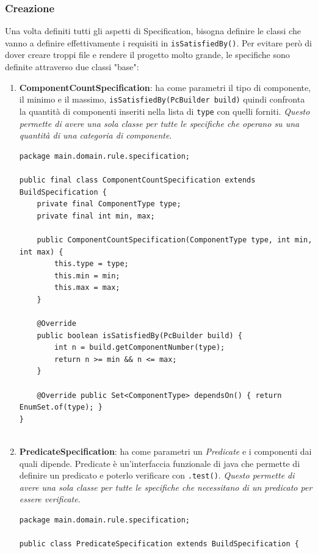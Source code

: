 \documentclass[12pt,a4paper]{article}
\begin{document}
\subsubsection{Creazione}
Una volta definiti tutti gli aspetti di Specification, bisogna definire le classi che vanno a definire effettivamente i requisiti in \texttt{isSatisfiedBy()}. Per evitare però di dover creare troppi file e rendere il progetto molto grande, le specifiche sono definite attraverso due classi "base":
\begin{enumerate}
    \item \textbf{ComponentCountSpecification}: ha come parametri il tipo di componente, il minimo e il massimo, \texttt{isSatisfiedBy(PcBuilder build)} quindi confronta la quantità di componenti inseriti nella lista di \texttt{type} con quelli forniti. \textit{Questo permette di avere una sola classe per tutte le specifiche che operano su una quantità di una categoria di componente}.
    \begin{lstlisting}[style=intellijlight, caption={A simple Java class}, label={lst:hello}]
package main.domain.rule.specification;

public final class ComponentCountSpecification extends BuildSpecification {
    private final ComponentType type;
    private final int min, max;

    public ComponentCountSpecification(ComponentType type, int min, int max) {
        this.type = type;
        this.min = min;
        this.max = max;
    }

    @Override
    public boolean isSatisfiedBy(PcBuilder build) {
        int n = build.getComponentNumber(type);
        return n >= min && n <= max;
    }

    @Override public Set<ComponentType> dependsOn() { return EnumSet.of(type); }
}


    \end{lstlisting}
    \item \textbf{PredicateSpecification}: ha come parametri un \textit{Predicate} e i componenti dai quali dipende. Predicate è un'interfaccia funzionale di java che permette di definire un predicato e poterlo verificare con \texttt{.test()}. \textit{Questo permette di avere una sola classe per tutte le specifiche che necessitano di un predicato per essere verificate}.
    \begin{lstlisting}[style=intellijlight, caption={A simple Java class}, label={lst:hello}]
package main.domain.rule.specification;

public class PredicateSpecification extends BuildSpecification {


\end{lstlisting}
\end{enumerate}
\end{document}
